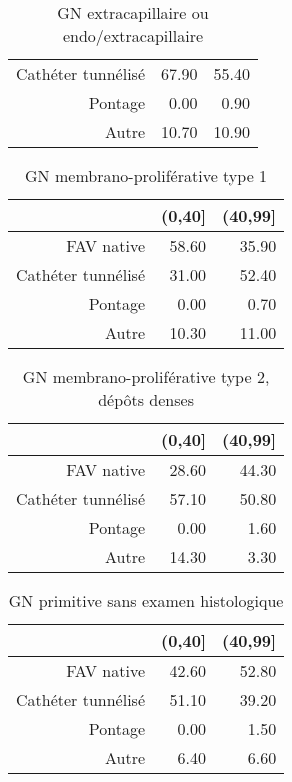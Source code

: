\documentclass[11pt,a4paper]{article}\usepackage[]{graphicx}\usepackage[]{color}
\begin{document}
\begin{multicols}{2}
\begin{table}[H]
\begin{tabular}{rrr}
  Cathéter tunnélisé & 67.90 & 55.40 \\ 
  Pontage & 0.00 & 0.90 \\ 
  Autre & 10.70 & 10.90 \\ 
   \hline
\end{tabular}
\caption{GN extracapillaire ou endo/extracapillaire} 
\end{table}
\begin{table}[H]
\centering
\begin{tabular}{rrr}
  \hline
 & (0,40] & (40,99] \\ 
  \hline
FAV native & 58.60 & 35.90 \\ 
  Cathéter tunnélisé & 31.00 & 52.40 \\ 
  Pontage & 0.00 & 0.70 \\ 
  Autre & 10.30 & 11.00 \\ 
   \hline
\end{tabular}
\caption{GN membrano-proliférative type 1} 
\end{table}
\begin{table}[H]
\centering
\begin{tabular}{rrr}
  \hline
 & (0,40] & (40,99] \\ 
  \hline
FAV native & 28.60 & 44.30 \\ 
  Cathéter tunnélisé & 57.10 & 50.80 \\ 
  Pontage & 0.00 & 1.60 \\ 
  Autre & 14.30 & 3.30 \\ 
   \hline
\end{tabular}
\caption{GN membrano-proliférative type 2, dépôts denses} 
\end{table}
\begin{table}[H]
\centering
\begin{tabular}{rrr}
  \hline
 & (0,40] & (40,99] \\ 
  \hline
FAV native & 42.60 & 52.80 \\ 
  Cathéter tunnélisé & 51.10 & 39.20 \\ 
  Pontage & 0.00 & 1.50 \\ 
  Autre & 6.40 & 6.60 \\ 
   \hline
\end{tabular}
\caption{GN primitive sans examen histologique} 
\end{table}

\end{multicols}
\end{document}
